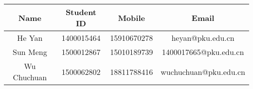 \begin{tabular}{cccc}
	\toprule
	Name	&	Student ID	&Mobile	&	Email\\
	\midrule
	He Yan	&	1400015464	& 15910670278 & heyan@pku.edu.cn\\

	Sun Meng &	1500012867	& 15010189739 & 1400017665@pku.edu.cn\\

	Wu Chuchuan &	1500062802	& 18811788416 & wuchuchuan@pku.edu.cn\\
	\bottomrule
\end{tabular}
